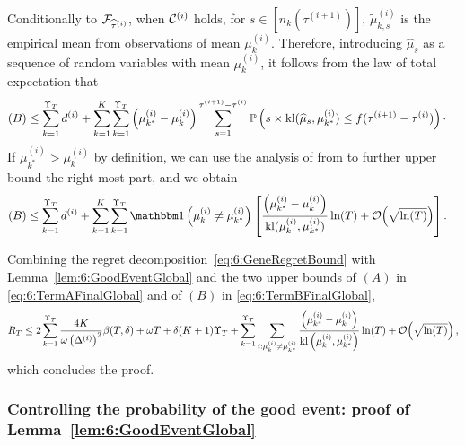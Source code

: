 Conditionally to $\mathcal{F}_{\widehat{\tau}^{(i)}}$, when $\mathcal{C}^{(i)}$ holds, for $s \in [n_k(\tau^{(i+1)})]$, $\widetilde{\mu}_{k,s}^{(i)}$ is the empirical mean from \iid{} observations of mean $\mu_k^{(i)}$.
Therefore, introducing $\widehat{\mu}_s$ as a sequence of \iid{} random variables with mean $\mu_k^{(i)}$, it follows from the law of total expectation that
\begin{align*}
    (B)& \leq \sum_{k=1}^{\Upsilon_T}d^{(i)}+\sum_{k=1}^K\sum_{k=1}^{\Upsilon_T}\left(\mu_{k^*}^{(i)} - \mu_k^{(i)}\right) \sum_{s=1}^{\tau^{(i+1)}-\tau^{(i)}}\mathbb{P}\left(s \times \mathrm{kl}(\widehat{\mu}_{s}, \mu_{k^*}^{(i)}) \leq f(\tau^{(i+1)} - \tau^{(i)})\right)\cdot
\end{align*}
%
If $\mu_{k^*}^{(i)} > \mu_k^{(i)}$ by definition, we can use the analysis of \klUCB{} from \cite{KLUCBJournal} to further upper bound the right-most part, and we obtain
%
\begin{align}\label{eq:6:TermBFinalGlobal}
    (B) & \leq \sum_{k=1}^{\Upsilon_T}d^{(i)}+\sum_{k=1}^K\sum_{k=1}^{\Upsilon_T}\indic\left(\mu_k^{(i)} \neq \mu_{k^*}^{(i)}\right)\left[ \frac{\left(\mu_{k^*}^{(i)} - \mu_k^{(i)}\right)}{\kl(\mu_k^{(i)},\mu_{k^*}^{(i)})}\log(T) + \bigO{\sqrt{\log(T)}}\right].
\end{align}

Combining the regret decomposition~\eqref{eq:6:GeneRegretBound} with Lemma~\ref{lem:6:GoodEventGlobal} and the two upper bounds of $(A)$ in \eqref{eq:6:TermAFinalGlobal} and of $(B)$ in \eqref{eq:6:TermBFinalGlobal},
\[R_T \leq 2\sum_{k=1}^{\Upsilon_T} \frac{4K}{\omega \left(\Delta^{(i)}\right)^2}\beta(T,\delta) +\omega T + \delta (K+1)\Upsilon_T  + \sum_{k=1}^{\Upsilon_T}\sum_{i : \mu_k^{(i)} \neq \mu_{k^*}^{(i)}} \frac{\left( \mu_{k^*}^{(i)}-\mu_k^{(i)}\right)}{\mathrm{kl}\left(\mu_k^{(i)},\mu_{k^*}^{(i)}\right)}\ln(T) + \mathop{}\mathopen{}\mathcal{O}\mathopen{}\left(\sqrt{\ln(T)}\right),\]
which concludes the proof.


\subsubsection{Controlling the probability of the good event: proof of Lemma~\ref{lem:6:GoodEventGlobal}}


